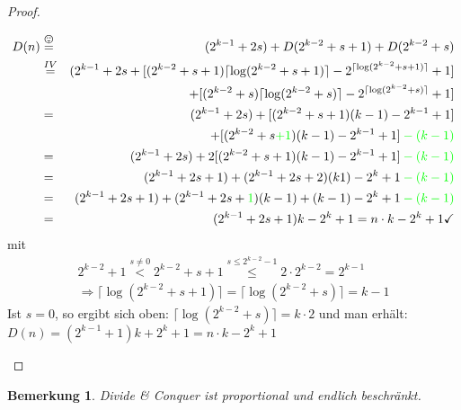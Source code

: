 \documentclass[a4paper,10pt]{scrartcl}
\newtheorem*{bemerkung*}{Bemerkung}
\begin{document}
\begin{proof}
\begin{description}
\begin{description}
\begin{eqnarray*}
                            D(n)&\stackrel{\smiley}{=}&(2^{k-1}+2s)+D(2^{k-2}+s+1)+D(2^{k-2}+s)\\
                            &\stackrel{IV}{=}&(2^{k-1}+2s+[(2^{k-2}+s+1)\lceil\log(2^{k-2}+s+1)\rceil-2^{\lceil\log(2^{k-2}+s+1)\rceil}+1]\\
                            && +[(2^{k-2}+s)\lceil\log(2^{k-2}+s)\rceil-2^{\lceil\log(2^{k-2}+s)\rceil}+1]\\
                            &=&(2^{k-1}+2s)+[(2^{k-2}+s+1)(k-1)-2^{k-1}+1]\\
                            && +[(2^{k-2}+s{\color{green}+1})(k-1)-2^{k-1}+1]\color{green}-(k-1)\\
                            &=&(2^{k-1}+2s)+2[(2^{k-2}+s+1)(k-1)-2^{k-1}+1]\color{green}-(k-1)\\
                            &=&(2^{k-1}+2s+1)+(2^{k-1}+2s+2)(k1)-2^k+1\color{green}-(k-1)\\
                            &=&(2^{k-1}+2s+1)+(2^{k-1}+2s+{\color{green}1})(k-1){\color{green}}+(k-1)-2^k+1\color{green}-(k-1)\\
                            &=&(2^{k-1}+2s+1)k-2^k+1=n\cdot k-2^k+1\checkmark
                           \end{eqnarray*}
                           mit
                           \begin{eqnarray*}
                            2^{k-2}+1\stackrel{s\neq0}{<}2^{k-2}+s+1\stackrel{s\leq2^{k-2}-1}{\leq}2\cdot2^{k-2}=2^{k-1}\\
                            \Rightarrow \lceil\log(2^{k-2}+s+1)\rceil=\lceil\log(2^{k-2}+s)\rceil=k-1
                           \end{eqnarray*}
                           Ist $s=0$, so ergibt sich oben: $\lceil\log(2^{k-2}+s)\rceil=k\cdot2$ und man erhält:
                           $D(n)=(2^{k-1}+1)k+2^k+1=n\cdot k-2^k+1$\checkmark
            \end{description}
 \end{description}
\end{proof}
\begin{bemerkung*}
 Divide \& Conquer ist proportional und endlich beschränkt.
\end{bemerkung*}


\end{document}
